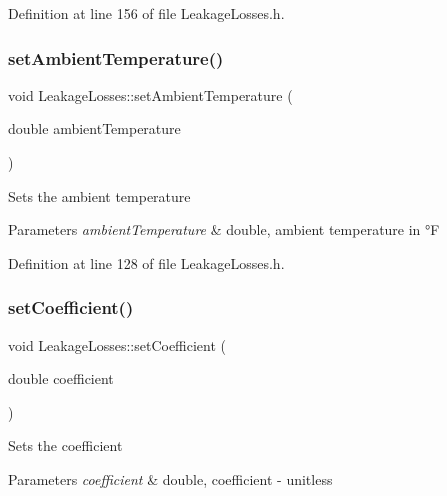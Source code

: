 Definition at line 156 of file Leakage\+Losses.\+h.

\mbox{\label{class_leakage_losses_aa6028111b3eb305d9ea6f9efea7c6c66}} 
\subsubsection{\texorpdfstring{set\+Ambient\+Temperature()}{setAmbientTemperature()}}
{\footnotesize\ttfamily void Leakage\+Losses\+::set\+Ambient\+Temperature (\begin{DoxyParamCaption}\item[{double}]{ambient\+Temperature }\end{DoxyParamCaption})\hspace{0.3cm}{\ttfamily [inline]}}

Sets the ambient temperature


\begin{DoxyParams}{Parameters}
{\em ambient\+Temperature} & double, ambient temperature in °F \\
\hline
\end{DoxyParams}


Definition at line 128 of file Leakage\+Losses.\+h.

\mbox{\label{class_leakage_losses_add2e96e75b6dd965370340dc03717434}} 
\subsubsection{\texorpdfstring{set\+Coefficient()}{setCoefficient()}}
{\footnotesize\ttfamily void Leakage\+Losses\+::set\+Coefficient (\begin{DoxyParamCaption}\item[{double}]{coefficient }\end{DoxyParamCaption})\hspace{0.3cm}{\ttfamily [inline]}}

Sets the coefficient


\begin{DoxyParams}{Parameters}
{\em coefficient} & double, coefficient -\/ unitless \\
\hline
\end{DoxyParams}


